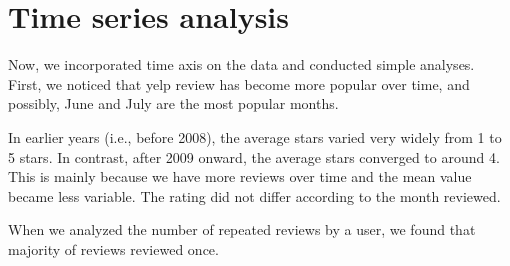 \documentclass[11pt]{article}
\begin{document}
\section*{Time series analysis}
Now, we incorporated time axis on the data and conducted simple analyses. First, we noticed that yelp review has become more popular over time, and possibly, June and July are the most popular months.

\par In earlier years (i.e., before 2008), the average stars varied very widely from 1 to 5 stars. In contrast, after 2009 onward, the average stars converged to around 4. This is mainly because we have more reviews over time and the mean value became less variable. The rating did not differ according to the month reviewed.

\par When we analyzed the number of repeated reviews by a user, we found that majority of reviews reviewed once.
\end{document}
